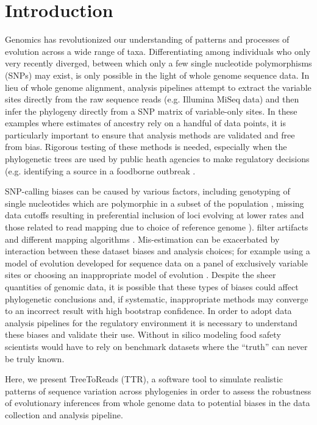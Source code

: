 \section{Introduction}
Genomics has revolutionized our understanding of patterns and processes of evolution across a wide range of taxa. 
Differentiating among individuals who only very recently diverged, between which only a few single nucleotide polymorphisms (SNPs) may exist, 
is only possible in the light of whole genome sequence data. 
In lieu of whole genome alignment, analysis pipelines attempt to extract the variable sites directly from the raw sequence reads (e.g. Illumina MiSeq data) 
and then infer the phylogeny directly from a SNP matrix of variable-only sites. In these examples where estimates of ancestry rely on a handful of data points, 
it is particularly important to ensure that analysis methods are validated and free from bias. Rigorous testing of these methods is needed,
especially when the phylogenetic trees are used by public heath agencies to make regulatory decisions (e.g. identifying a source in a foodborne outbreak \citep{hoffmann_tracing_2015}. 

SNP-calling biases can be caused by various factors, 
including genotyping of single nucleotides which are polymorphic in a subset of the population \citep{mctavish_how_2015}, 
missing data cutoffs resulting in preferential inclusion of loci evolving at lower rates \citep{huang_unforeseen_2014} and those related to read mapping due to choice of reference genome \citep{bertels_automated_2014}). 
filter artifacts \citep{li_toward_2014} and different mapping algorithms \citep{pightling_choice_2014}. 
Mis-estimation can be exacerbated by interaction between these dataset biases and analysis choices; 
for example using a model of evolution developed for sequence data on a panel of exclusively variable sites \citep{lewis_likelihood_2001} 
or choosing an inappropriate model of evolution \citep{sullivan_are_1997}. Despite the sheer quantities of genomic data, 
it is possible that these types of biases could affect phylogenetic conclusions and, if systematic, inappropriate methods may converge to an incorrect result with high bootstrap confidence. 
In order to adopt data analysis pipelines for the regulatory environment it is necessary to understand these biases and validate their use. 
Without in silico modeling food safety scientists would have to rely on benchmark datasets where the “truth” can never be truly known.

Here, we present TreeToReads (TTR), a software tool to simulate realistic patterns of sequence variation across phylogenies 
in order to assess the robustness of evolutionary inferences from whole genome data to potential biases in the data collection and analysis pipeline. 


